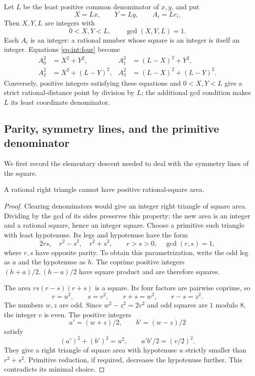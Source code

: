 Let $L$ be the least positive common denominator of $x,y$, and put
\begin{equation}\label{eq:int:lattice}
 X=Lx,\qquad Y=Ly,\qquad A_i=Lr_i.
\end{equation}
Then $X,Y,L$ are integers with
\[
 0<X,Y<L,\qquad \gcd(X,Y,L)=1.
\]
Each $A_i$ is an integer: a rational number whose square is an integer
is itself an integer. Equations \eqref{eq:int:four} become
\begin{equation}\label{eq:int:integer-four}
\begin{aligned}
 A_0^2&=X^2+Y^2,&A_1^2&=(L-X)^2+Y^2,\\
 A_2^2&=X^2+(L-Y)^2,&A_3^2&=(L-X)^2+(L-Y)^2.
\end{aligned}
\end{equation}
Conversely, positive integers satisfying these equations and
$0<X,Y<L$ give a strict rational-distance point by division by $L$;
the additional gcd condition makes $L$ its least coordinate denominator.

\subsection{Parity, symmetry lines, and the primitive denominator}

We first record the elementary descent needed to deal with the symmetry
lines of the square.

\begin{lemma}\label{lem:int:fermat}
A rational right triangle cannot have positive rational-square area.
\end{lemma}

\begin{proof}
Clearing denominators would give an integer right triangle of square
area. Dividing by the gcd of its sides preserves this property: the
new area is an integer and a rational square, hence an integer square.
Choose a primitive such triangle with least hypotenuse. Its legs and
hypotenuse have the form
\[
 2rs,\quad r^2-s^2,\quad r^2+s^2,
 \qquad r>s>0,\quad \gcd(r,s)=1,
\]
where $r,s$ have opposite parity. To obtain this parametrization, write
the odd leg as $a$ and the hypotenuse as $h$. The coprime positive
integers $(h+a)/2,(h-a)/2$ have square product and are therefore
squares.

The area $rs(r-s)(r+s)$ is a square. Its four factors are pairwise
coprime, so
\[
 r=u^2,\qquad s=v^2,\qquad r+s=w^2,\qquad r-s=z^2.
\]
The numbers $w,z$ are odd. Since $w^2-z^2=2v^2$ and odd squares are
$1$ modulo $8$, the integer $v$ is even. The positive integers
\[
 a'=(w+z)/2,\qquad b'=(w-z)/2
\]
satisfy
\[
 (a')^2+(b')^2=u^2,\qquad a'b'/2=(v/2)^2.
\]
They give a right triangle of square area with hypotenuse $u$ strictly
smaller than $r^2+s^2$. Primitive reduction, if required, decreases
the hypotenuse further. This contradicts its minimal choice.
\end{proof}

